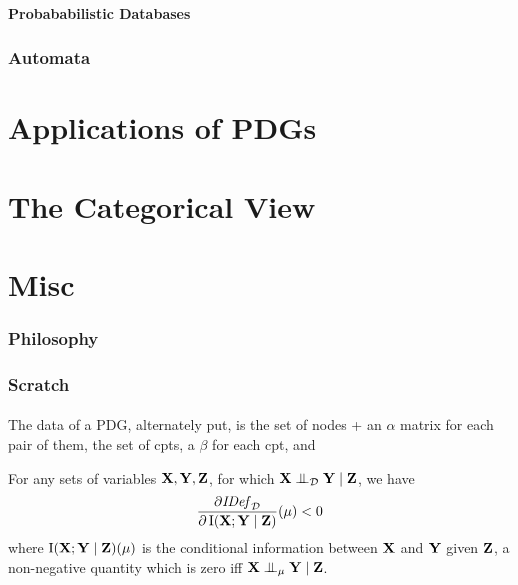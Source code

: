 \documentclass{article}
\begin{document}
\subsection{Probababilistic Databases}

\section{Automata}


\part{Applications of PDGs}

\part{The Categorical View}

\part{Misc}
\section{Philosophy}
\section{Scratch}
	
\begin{inactive}
	\subsection{}
	The data of a PDG, alternately put, is the set of nodes + an $\alpha$ matrix for each pair of them, the set of cpts, a $\beta$ for each cpt, and 
	
	\begin{prop}
		For any sets of variables $\mathbf X, \mathbf Y, \mathbf Z$, for which $\mathbf X \mathrel{\perp\mspace{-10mu}\perp}_{\mathcal D} \mathbf Y \mid \mathbf Z$, we have
		\[ \frac{\partial \mathit{IDef}_{\cal D}}{\partial \operatorname{\mathrm{I}}(\mathbf X; \mathbf Y \mid \mathbf Z)}(\mu) < 0 \]
		where $\operatorname{\mathrm{I}}(\mathbf X; \mathbf Y \mid \mathbf Z)(\mu)$ is the conditional information between $\mathbf X$ and $\mathbf Y$ given $\mathbf Z$, a non-negative quantity which is zero iff $\mathbf X \mathrel{\perp\mspace{-10mu}\perp}_{\mu} \mathbf Y \mid \mathbf Z$. 
	\end{prop}
\end{inactive}
\end{document}
